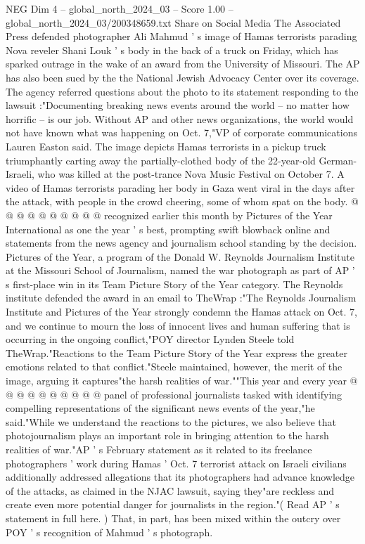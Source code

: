 \begin{textsample}{NEG Dim 4 – global\_north\_2024\_03 – Score 1.00 – global\_north\_2024\_03/200348659.txt}  \label{ex:f4_neg_214}
Share on Social Media The Associated Press defended photographer Ali Mahmud ' s image of Hamas terrorists parading Nova reveler Shani Louk ' s body in the back of a truck on Friday, which has sparked outrage in the wake of an award from the University of Missouri.
The AP has also been sued by the the National Jewish Advocacy Center over its coverage.
The agency referred questions about the photo to its statement responding to the lawsuit :"Documenting breaking news events around the world -- no matter how horrific -- is our job.
Without AP and other news organizations, the world would not have known what was happening on Oct. 7,"VP of corporate communications Lauren Easton said.
The image depicts Hamas terrorists in a pickup truck triumphantly carting away the partially-clothed body of the 22-year-old German-Israeli, who was killed at the post-trance Nova Music Festival on October 7.
A video of Hamas terrorists parading her body in Gaza went viral in the days after the attack, with people in the crowd cheering, some of whom spat on the body. @ @ @ @ @ @ @ @ @ @ recognized earlier this month by Pictures of the Year International as one the year ' s best, prompting swift blowback online and statements from the news agency and journalism school standing by the decision.
Pictures of the Year, a program of the Donald W.
Reynolds Journalism Institute at the Missouri School of Journalism, named the war photograph as part of AP ' s first-place win in its Team Picture Story of the Year category.
The Reynolds institute defended the award in an email to TheWrap :"The Reynolds Journalism Institute and Pictures of the Year strongly condemn the Hamas attack on Oct. 7, and we continue to mourn the loss of innocent lives and human suffering that is occurring in the ongoing conflict,"POY director Lynden Steele told TheWrap."Reactions to the Team Picture Story of the Year express the greater emotions related to that conflict."Steele maintained, however, the merit of the image, arguing it captures"the harsh realities of war.""This year and every year @ @ @ @ @ @ @ @ @ @ panel of professional journalists tasked with identifying compelling representations of the significant news events of the year,"he said."While we understand the reactions to the pictures, we also believe that photojournalism plays an important role in bringing attention to the harsh realities of war."AP ' s February statement as it related to its freelance photographers ' work during Hamas ' Oct. 7 terrorist attack on Israeli civilians additionally addressed allegations that its photographers had advance knowledge of the attacks, as claimed in the NJAC lawsuit, saying they"are reckless and create even more potential danger for journalists in the region."( Read AP ' s statement in full here. ) That, in part, has been mixed within the outcry over POY ' s recognition of Mahmud ' s photograph.

\end{textsample}
